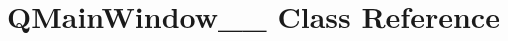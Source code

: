 \hypertarget{classGUI_1_1QMainWindow____4}{}\section{Q\+Main\+Window\+\_\+\+\_ Class Reference}
\label{classGUI_1_1QMainWindow____4}
